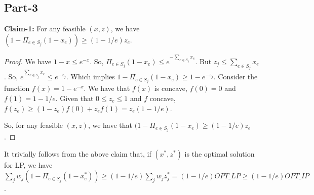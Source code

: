 \documentclass{article}
\begin{document}
\subsection{Part-3}
\textbf{Claim-1:} For any feasible $(x,z)$, we have $(1 - \Pi_{e \in S_j}(1- x_e)) \geq (1 - 1/e)z_e$.
\begin{proof}
We have $1 - x \leq e^{-x}$. So, $\Pi_{e \in S_j}(1 - x_e) \leq e^{-\sum_{e \in S_j}x_e}$. But $z_j \leq \sum_{e \in S_j}x_e$. So, $e^{\sum_{e \in S_j}x_e} \leq e^{-z_j}$. Which implies $1 - \Pi_{e \in S_j}(1 - x_e) \geq 1 - e^{-z_j}$. Consider the function $f(x) = 1 - e^{-x}$. We have that $f(x)$ is concave, $f(0) = 0$ and $f(1) = 1-1/e$. Given that $0 \leq z_e \leq 1$ and $f$ concave, $f(z_e) \geq (1 - z_e)f(0) + z_ef(1) = z_e(1 - 1/e)$.

So, for any feasible $(x,z)$, we have that $(1 - \Pi_{e \in S_j}(1 - x_e) \geq (1-1/e)z_e$. 
\end{proof}
It trivially follows from the above claim that, if $(x^*,z^*)$ is the optimal solution for LP, we have $\sum_{j}w_j(1 - \Pi_{e \in S_j}(1-x^*_e)) \geq (1 - 1/e)\sum_{j}w_jz_j^* = (1-1/e)OPT\_LP \geq (1-1/e)OPT\_IP$.
\end{document}
